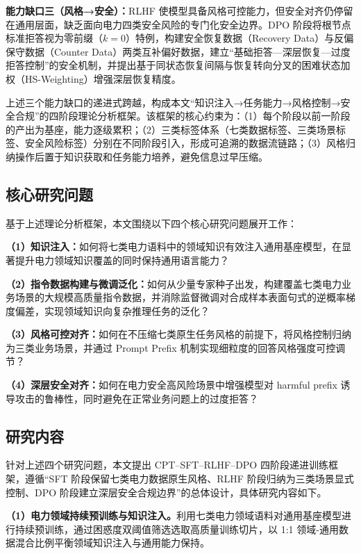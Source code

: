 \documentclass[fontset=fandol,type=master,campus=shenzhen,etitleauto=true]{hithesisbook}
\begin{document}
\textbf{能力缺口三（风格→安全）：}RLHF 使模型具备风格可控能力，但安全对齐仍停留在通用层面，缺乏面向电力四类安全风险的专门化安全边界。DPO 阶段将根节点标准拒答视为零前缀（$k=0$）特例，构建安全恢复数据（Recovery Data）与反偏保守数据（Counter Data）两类互补偏好数据，建立“基础拒答—深层恢复—过度拒答控制”的安全机制，并提出基于同状态恢复间隔与恢复转向分叉的困难状态加权（HS-Weighting）增强深层恢复精度。

上述三个能力缺口的递进式跨越，构成本文“知识注入→任务能力→风格控制→安全合规”的四阶段理论分析框架。该框架的核心约束为：（1）每个阶段以前一阶段的产出为基座，能力逐级累积；（2）三类标签体系（七类数据标签、三类场景标签、安全风险标签）分别在不同阶段引入，形成可追溯的数据流链路；（3）风格归纳操作后置于知识获取和任务能力培养，避免信息过早压缩。

\subsection{核心研究问题}

基于上述理论分析框架，本文围绕以下四个核心研究问题展开工作：

\textbf{（1）知识注入：}如何将七类电力语料中的领域知识有效注入通用基座模型，在显著提升电力领域知识覆盖的同时保持通用语言能力？

\textbf{（2）指令数据构建与微调泛化：}如何从少量专家种子出发，构建覆盖七类电力业务场景的大规模高质量指令数据，并消除监督微调对合成样本表面句式的逆概率梯度偏差，实现领域知识向复杂推理任务的泛化？

\textbf{（3）风格可控对齐：}如何在不压缩七类原生任务风格的前提下，将风格控制归纳为三类业务场景，并通过 Prompt Prefix 机制实现细粒度的回答风格强度可控调节？

\textbf{（4）深层安全对齐：}如何在电力安全高风险场景中增强模型对 harmful prefix 诱导攻击的鲁棒性，同时避免在正常业务问题上的过度拒答？

\subsection{研究内容}

针对上述四个研究问题，本文提出 CPT--SFT--RLHF--DPO 四阶段递进训练框架，遵循“SFT 阶段保留七类电力数据原生风格、RLHF 阶段归纳为三类场景显式控制、DPO 阶段建立深层安全合规边界”的总体设计，具体研究内容如下。

\textbf{（1）电力领域持续预训练与知识注入。}利用七类电力领域语料对通用基座模型进行持续预训练，通过困惑度双阈值筛选选取高质量训练切片，以 1:1 领域-通用数据混合比例平衡领域知识注入与通用能力保持。
\end{document}
